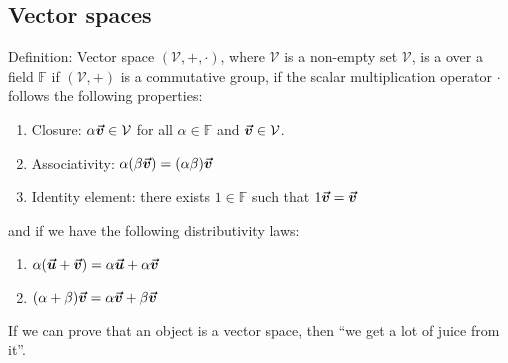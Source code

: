 \documentclass[a4paper]{article}
\begin{document}
\subsection{Vector spaces}
\begin{parag}{Definition: Vector space}
    $\left(\mathcal{V}, +, \cdot\right)$, where $\mathcal{V}$ is a non-empty set $\mathcal{V}$, is a  over a field $\mathbb{F}$ if $\left(\mathcal{V}, +\right)$ is a commutative group, if the scalar multiplication operator $\cdot$ follows the following properties:
    \begin{enumerate}
        \item Closure: $\alpha \bm{\protect\vec{v}} \in \mathcal{V}$ for all $\alpha \in \mathbb{F}$ and $\bm{\protect\vec{v}} \in \mathcal{V}$.
        \item Associativity: $\alpha\left(\beta \bvec{v}\right) = \left(\alpha \beta\right)\bvec{v}$
        \item Identity element: there exists $1 \in \mathbb{F}$ such that $1 \bm{\protect\vec{v}} = \bm{\protect\vec{v}}$
    \end{enumerate}
    and if we have the following distributivity laws:
    \begin{enumerate}
        \item $\alpha\left(\bvec{u} + \bvec{v}\right) = \alpha \bvec{u} + \alpha \bvec{v}$
        \item $\left(\alpha + \beta\right)\bvec{v} = \alpha \bvec{v} + \beta \bvec{v}$
    \end{enumerate}
    
    If we can prove that an object is a vector space, then ``we get a lot of juice from it''.
\end{parag}
\end{document}
